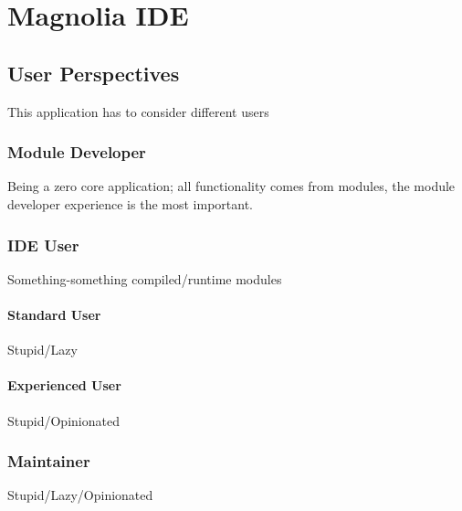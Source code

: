 \chapter{Magnolia IDE}

\section{User Perspectives}

This application has to consider different users

\subsection{Module Developer}

Being a zero core application; all functionality comes from modules, the module
developer experience is the most important.

\subsection{IDE User}

Something-something compiled/runtime modules

\subsubsection{Standard User}

Stupid/Lazy

\subsubsection{Experienced User}

Stupid/Opinionated

\subsection{Maintainer}

Stupid/Lazy/Opinionated
